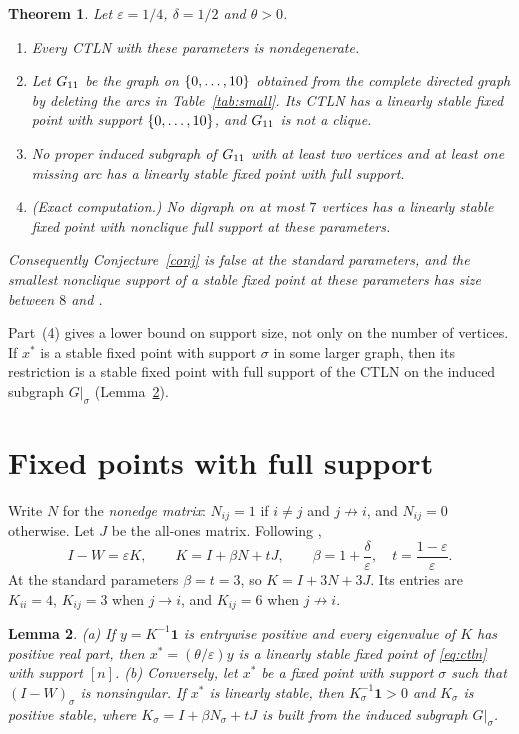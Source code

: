 \documentclass[11pt]{amsart}
\newtheorem{theorem}{Theorem}[section]
\newtheorem{lemma}[theorem]{Lemma}
\theoremstyle{remark}
\newcommand{\one}{\mathbf 1}
\begin{document}
\begin{theorem}\label{thm:main}
Let $\varepsilon=1/4$, $\delta=1/2$ and $\theta>0$.
\begin{enumerate}
\item Every CTLN with these parameters is nondegenerate.
\item Let $G_{11}$ be the graph on $\{0,\dots,10\}$ obtained from the complete directed graph by deleting the \MSMALL{} arcs in Table~\ref{tab:small}. Its CTLN has a linearly stable fixed point with support $\{0,\dots,10\}$, and $G_{11}$ is not a clique.
\item No proper induced subgraph of $G_{11}$ with at least two vertices and at least one missing arc has a linearly stable fixed point with full support.
\item (Exact computation.) No digraph on at most $7$ vertices has a linearly stable fixed point with nonclique full support at these parameters.
\end{enumerate}
Consequently Conjecture~\ref{conj} is false at the standard parameters, and the smallest nonclique support of a stable fixed point at these parameters has size between $8$ and \NSMALL.
\end{theorem}

Part~(4) gives a lower bound on support size, not only on the number of vertices. If $x^*$ is a stable fixed point with support $\sigma$ in some larger graph, then its restriction is a stable fixed point with full support of the CTLN on the induced subgraph $G|_\sigma$ (Lemma~\ref{lem:full}).

\section{Fixed points with full support}

Write $N$ for the \emph{nonedge matrix}: $N_{ij}=1$ if $i\neq j$ and $j\not\to i$, and $N_{ij}=0$ otherwise. Let $J$ be the all-ones matrix. Following \cite{Geneson2026},
\begin{equation}\label{eq:K}
 I-W=\varepsilon K,\qquad K=I+\beta N+tJ,\qquad \beta=1+\frac{\delta}{\varepsilon},\quad t=\frac{1-\varepsilon}{\varepsilon}.
\end{equation}
At the standard parameters $\beta=t=3$, so $K=I+3N+3J$. Its entries are $K_{ii}=4$, $K_{ij}=3$ when $j\to i$, and $K_{ij}=6$ when $j\not\to i$.

\begin{lemma}\label{lem:full}
(a) If $y=K^{-1}\one$ is entrywise positive and every eigenvalue of $K$ has positive real part, then $x^*=(\theta/\varepsilon)y$ is a linearly stable fixed point of \eqref{eq:ctln} with support $[n]$.
(b) Conversely, let $x^*$ be a fixed point with support $\sigma$ such that $(I-W)_\sigma$ is nonsingular. If $x^*$ is linearly stable, then $K_\sigma^{-1}\one>0$ and $K_\sigma$ is positive stable, where $K_\sigma=I+\beta N_\sigma+tJ$ is built from the induced subgraph $G|_\sigma$.
\end{lemma}
\end{document}
